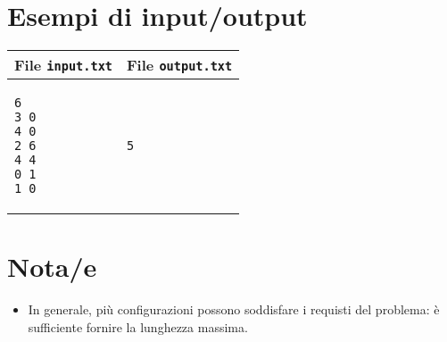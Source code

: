 \documentclass[a4paper,11pt]{article}
\begin{document}
\section*{Esempi di input/output}
    \noindent
    \begin{tabular}{p{11cm}|p{5cm}}
    \toprule
    \textbf{File \texttt{input.txt}}
    & \textbf{File \texttt{output.txt}}
    \\
    \midrule
    \scriptsize
    \begin{verbatim}
6
3 0
4 0
2 6
4 4
0 1
1 0
\end{verbatim}
    &
    \scriptsize
    \begin{verbatim}
5
\end{verbatim}
    \\
    \bottomrule
    \end{tabular}

\section*{Nota/e}

\begin{itemize}
  \item In generale, più configurazioni possono soddisfare i requisti del problema: è sufficiente fornire la lunghezza massima.
\end{itemize}
\end{document}
